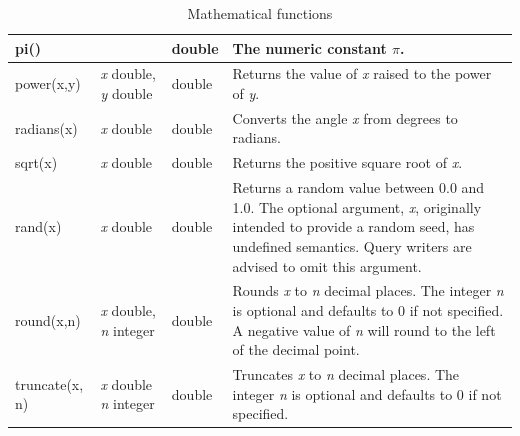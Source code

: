 \documentclass[11pt,a4paper]{ivoa}
\begin{document}
\begin{table}[th]
\begin{tabular}{|p{}|p{}|p{}|p{}|}
        \hline
        pi() &
        &
        double &
        The numeric constant \(\pi\).
        \tabularnewline
        
        \hline
        power(x,y) &
        \textit{x} double,
        \newline
        \textit{y} double &
        double &
        Returns the value of \textit{x} raised to the power of \textit{y}.
        \tabularnewline

        \hline
        radians(x) &
        \textit{x} double &
        double &
        Converts the angle \textit{x} from degrees to radians.
        \tabularnewline

        \hline
        sqrt(x) &
        \textit{x} double &
        double &
        Returns the positive square root of \textit{x}.
        \tabularnewline

        \hline
        rand(x) &
        \textit{x} double &
        double &
        Returns a random value between 0.0 and 1.0.
        The optional argument, \textit{x}, originally intended to provide a random seed,
        has undefined semantics. Query writers are advised to omit this argument.
        \tabularnewline

        \hline
        round(x,n) &
        \textit{x} double,
        \newline
        \textit{n} integer &
        double &
        Rounds \textit{x} to \textit{n} decimal places.
        The integer \textit{n} is optional and defaults to 0 if not specified. 
        A negative value of \textit{n} will round to the left of the decimal point.
        \tabularnewline

        \hline
        truncate(x, n) &
        \textit{x} double
        \newline
        \textit{n} integer &
        double &
        Truncates \textit{x} to \textit{n} decimal places.
        The integer \textit{n} is optional and defaults to 0 if not specified. 
        \tabularnewline
        \hline
    \end{tabular}
    \caption{Mathematical functions}
    \label{table:math.functions}
\end{table}
\end{document}
